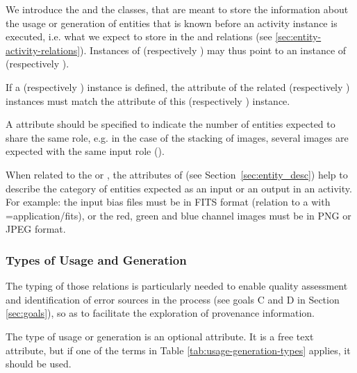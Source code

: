 We introduce the  and the  classes, that are meant to store the information about the usage or generation of entities that is known before an activity instance is executed, i.e. what we expect to store in the  and  relations (see \ref{sec:entity-activity-relations}). 
Instances of  (respectively ) may thus point to an instance of  (respectively ).


If a  (respectively ) instance is defined, the  attribute of the related  (respectively ) instances must match the  attribute of this  (respectively ) instance.

A  attribute  should be specified to indicate the number of entities expected to share the same role, e.g. in the case of the stacking of images, several images are expected with the same input role ().

When related to the  or , the attributes of  (see Section~\ref{sec:entity_desc}) help to describe the category of entities expected as an input or an output in an activity. For example: the input bias files must be in FITS format (relation to a  with =application/fits), or the red, green and blue channel images must be in PNG or JPEG format. 


\subsubsection{Types of Usage and Generation}
\label{sec:ugtypes}

The typing of those relations is particularly needed to enable quality assessment and identification of error sources in the process (see goals C and D in Section \ref{sec:goals}), so as to facilitate the exploration of provenance information. 

The type of usage or generation is an optional attribute.
It is a free text attribute, but if one of the terms in Table \ref{tab:usage-generation-types} applies, it should be used.


